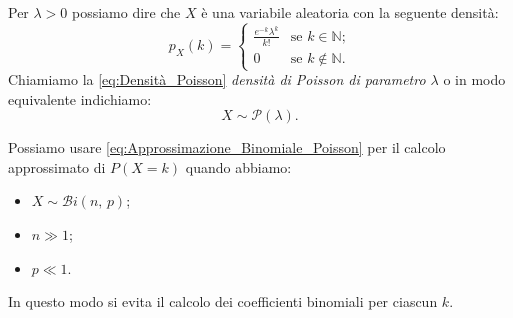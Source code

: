 \begin{defn}
                Per $\lambda > 0$ possiamo dire che $X$ è una variabile aleatoria con la seguente densità:
                \begin{equation}\label{eq:Densità_Poisson}
                    p_X(k) = \begin{cases}
                        \frac{e^{-k}\lambda^k}{k!} & \text{se $k \in \mathbb{N}$;} \\
                        0 & \text{se $k \notin \mathbb{N}$.}
                    \end{cases}
                \end{equation}
                Chiamiamo la \eqref{eq:Densità_Poisson} \emph{densità di Poisson di parametro $\lambda$} o in modo equivalente indichiamo: \[
                    X \sim \mathcal{P}(\lambda)
                .\] 
            \end{defn}
            \begin{obsv}
                Possiamo usare \eqref{eq:Approssimazione_Binomiale_Poisson} per il calcolo approssimato di $P(X = k)$ quando abbiamo:
                \begin{itemize}
                    \item $X \sim \mathcal{B}i(n,\,p)$;
                    \item $n \gg 1$;
                    \item $p \ll 1$.
                \end{itemize}
                In questo modo si evita il calcolo dei coefficienti binomiali per ciascun $k$.
            \end{obsv}
